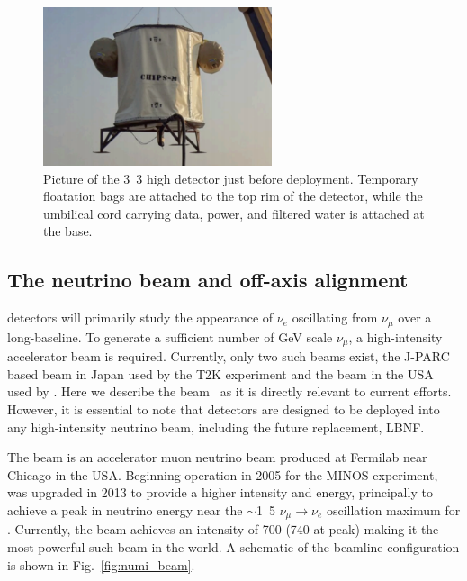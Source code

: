 \begin{figure} %
    \includegraphics[width=0.6\textwidth]{diagrams/4-chips/chips_m.pdf}
    \caption[Picture of the \chipsm detector]
    {Picture of the \unit{3.3}{} high \chipsm detector just before deployment. Temporary
        floatation bags are attached to the top rim of the detector, while the umbilical cord
        carrying data, power, and filtered water is attached at the base.}
    \label{fig:chips_m}
\end{figure}

\subsection{The neutrino beam and off-axis alignment} %
\label{sec:chips_concept_beam} %

\chips detectors will primarily study the appearance of $\nu_{e}$ oscillating from $\nu_{\mu}$
over a long-baseline. To generate a sufficient number of GeV scale $\nu_{\mu}$, a high-intensity
accelerator beam is required. Currently, only two such beams exist, the J-PARC based beam in Japan
used by the T2K experiment and the \numi beam in the USA used by \nova. Here we describe the \numi
beam~\cite{adamson2016} as it is directly relevant to current \chips efforts. However, it is
essential to note that \chips detectors are designed to be deployed into any high-intensity
neutrino beam, including the future \numi replacement, LBNF.

The \numi beam is an accelerator muon neutrino beam produced at Fermilab near Chicago in the USA.
Beginning operation in 2005 for the MINOS experiment, \numi was upgraded in 2013 to provide a
higher intensity and energy, principally to achieve a peak in neutrino energy near the
$\sim$\unit{1.5}{\GeV} $\nu_{\mu}\rightarrow\nu_{e}$ oscillation maximum for \nova. Currently, the
\numi beam achieves an intensity of \unit{700}{} (\unit{740}{} at peak) making
it the most powerful such beam in the world. A schematic of the \numi beamline configuration is
shown in Fig.~\ref{fig:numi_beam}.

